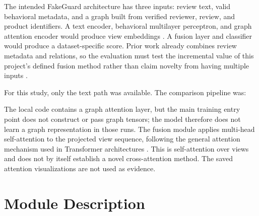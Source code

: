 \documentclass[12pt,a4paper]{report}
\begin{document}
The intended FakeGuard architecture has three inputs: review text, valid behavioral metadata, and a graph built from verified reviewer, review, and product identifiers. A text encoder, behavioral multilayer perceptron, and graph attention encoder would produce view embeddings \cite{velickovic2018}. A fusion layer and classifier would produce a dataset-specific score. Prior work already combines review metadata and relations, so the evaluation must test the incremental value of this project's defined fusion method rather than claim novelty from having multiple inputs \cite{rayana2015,li2019gas}.

\begin{center}
\end{center}

For this study, only the text path was available. The comparison pipeline was:

\begin{center}
\end{center}

The local code contains a graph attention layer, but the main training entry point does not construct or pass graph tensors; the model therefore does not learn a graph representation in those runs. The fusion module applies multi-head self-attention to the projected view sequence, following the general attention mechanism used in Transformer architectures \cite{vaswani2017}. This is self-attention over views and does not by itself establish a novel cross-attention method. The saved attention visualizations are not used as evidence.

\section{Module Description}
\end{document}

